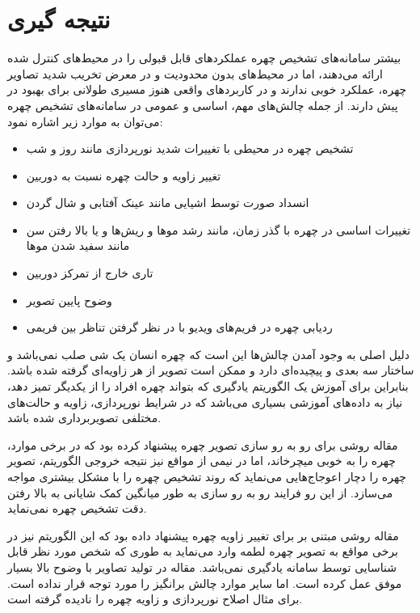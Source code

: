 \section{نتیجه گیری}
بیشتر سامانه‌های تشخیص چهره عملکردهای قابل قبولی را در محیط‌های کنترل شده ارائه می‌دهند، اما در محیط‌های بدون محدودیت و در معرض تخریب شدید تصاویر چهره، عملکرد خوبی ندارند و در کاربردهای واقعی هنوز مسیری طولانی برای بهبود در پیش دارند. از جمله چالش‌های مهم، اساسی و عمومی در سامانه‌های تشخیص چهره می‌توان به موارد زیر اشاره نمود:

\begin{itemize}
\item
تشخیص چهره در محیطی با تغییرات شدید نورپردازی مانند روز و شب 
 \item
تغییر زاویه و حالت چهره نسبت به دوربین 
 \item
انسداد صورت توسط اشیایی مانند عینک آفتابی و شال گردن 
 \item
تغییرات اساسی در چهره با گذر زمان، مانند رشد موها و ریش‌ها و یا بالا رفتن سن مانند سفید شدن موها 
 \item
تاری خارج از تمرکز دوربین 
 \item
وضوح پایین تصویر 
 \item
ردیابی چهره در فریم‌های ویدیو با در نظر گرفتن تناظر بین فریمی 
\end{itemize}

دلیل اصلی به وجود آمدن چالش‌ها این است که چهره انسان یک شی صلب نمی‌باشد و ساختار سه بعدی و پیچیده‌ای دارد و ممکن است تصویر از هر زاویه‌ای گرفته شده باشد. بنابراین برای آموزش یک الگوریتم یادگیری که بتواند چهره افراد را از یکدیگر تمیز دهد، نیاز به داده‌های آموزشی بسیاری می‌باشد که در شرایط نورپردازی، زاویه و حالت‌های مختلفی تصویربرداری شده باشد.

\noindent
مقاله \cite{HAGHIGHAT201623} روشی برای رو به رو سازی تصویر چهره پیشنهاد کرده بود که در برخی موارد، چهره را به خوبی میچرخاند، اما در نیمی از مواقع نیز نتیجه خروجی الگوریتم، تصویر چهره را دچار اعوجاج‌هایی می‌نماید که روند تشخیص چهره را با مشکل بیشتری مواجه می‌سازد. از این رو فرایند رو به رو سازی به طور میانگین کمک شایانی به بالا رفتن دقت تشخیص چهره نمی‌نماید.

\noindent
مقاله \cite{radford2016unsupervised} روشی مبتنی بر  برای تغییر زاویه چهره پیشنهاد داده بود که این الگوریتم نیز در برخی مواقع به تصویر چهره لطمه وارد می‌نماید به طوری که شخص مورد نظر قابل شناسایی توسط سامانه یادگیری نمی‌باشد.
\noindent
مقاله  \cite{BANERJEE2018246} در تولید تصاویر با وضوح بالا بسیار موفق عمل کرده است. اما سایر موارد چالش برانگیز را مورد توجه قرار نداده است. برای مثال اصلاح نورپردازی و زاویه چهره را نادیده گرفته است.

